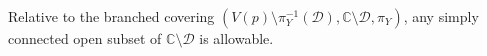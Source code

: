 Relative to the branched covering $(V(p) \setminus \pi_Y^{-1}(\mathcal{D}), \mathbb{C} \setminus \mathcal{D}, \pi_Y)$, any simply connected open subset of $\mathbb{C} \setminus \mathcal{D}$ is allowable.
